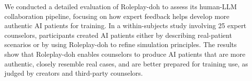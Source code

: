 \documentclass[11pt]{article}
\begin{document}

We conducted a detailed evaluation of Roleplay-doh to assess its human-LLM collaboration pipeline, focusing on how expert feedback helps develop more authentic AI patients for training. 
In a within-subjects study involving 25 expert counselors, participants created AI patients either by describing real-patient scenarios or by using Roleplay-doh to refine simulation principles. 
The results show that Roleplay-doh enables counselors to produce AI patients that are more authentic, closely resemble real cases, and are better prepared for training use, as judged by creators and third-party counselors.
\end{document}
